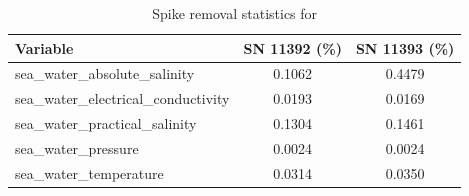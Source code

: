 \begin{table}[h]
\centering
\caption{Spike removal statistics for \projectname{} \casenumber{}}
\label{tab:ntas18_spike_stats}
\begin{tabular}{|l|c|c|}
\hline
Variable & SN 11392 (\%) & SN 11393 (\%) \\
\hline
sea\_water\_absolute\_salinity & 0.1062 & 0.4479 \\
sea\_water\_electrical\_conductivity & 0.0193 & 0.0169 \\
sea\_water\_practical\_salinity & 0.1304 & 0.1461 \\
sea\_water\_pressure & 0.0024 & 0.0024 \\
sea\_water\_temperature & 0.0314 & 0.0350 \\
\hline
\end{tabular}
\end{table}
